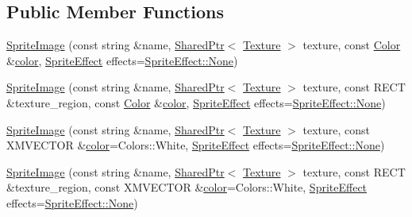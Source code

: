 \subsection*{Public Member Functions}
\begin{DoxyCompactItemize}
\item 
\hyperlink{classmage_1_1_sprite_image_ab94d36963a20b768167c92d5ae1ed116}{Sprite\+Image} (const string \&name, \hyperlink{namespacemage_a1e01ae66713838a7a67d30e44c67703e}{Shared\+Ptr}$<$ \hyperlink{classmage_1_1_texture}{Texture} $>$ texture, const \hyperlink{structmage_1_1_color}{Color} \&\hyperlink{namespacemage_a8ac46837ac2f6a9b756e66979165acd6}{color}, \hyperlink{namespacemage_a9cfe18123066ba4236f548f9de75d881}{Sprite\+Effect} effects=\hyperlink{namespacemage_a9cfe18123066ba4236f548f9de75d881a6adf97f83acf6453d4a6a4b1070f3754}{Sprite\+Effect\+::\+None})
\item 
\hyperlink{classmage_1_1_sprite_image_ad921221e62330d1c872d3e4329a46c35}{Sprite\+Image} (const string \&name, \hyperlink{namespacemage_a1e01ae66713838a7a67d30e44c67703e}{Shared\+Ptr}$<$ \hyperlink{classmage_1_1_texture}{Texture} $>$ texture, const R\+E\+CT \&texture\+\_\+region, const \hyperlink{structmage_1_1_color}{Color} \&\hyperlink{namespacemage_a8ac46837ac2f6a9b756e66979165acd6}{color}, \hyperlink{namespacemage_a9cfe18123066ba4236f548f9de75d881}{Sprite\+Effect} effects=\hyperlink{namespacemage_a9cfe18123066ba4236f548f9de75d881a6adf97f83acf6453d4a6a4b1070f3754}{Sprite\+Effect\+::\+None})
\item 
\hyperlink{classmage_1_1_sprite_image_a00b0f39f640c1a80ff83dc53b62d046c}{Sprite\+Image} (const string \&name, \hyperlink{namespacemage_a1e01ae66713838a7a67d30e44c67703e}{Shared\+Ptr}$<$ \hyperlink{classmage_1_1_texture}{Texture} $>$ texture, const X\+M\+V\+E\+C\+T\+OR \&\hyperlink{namespacemage_a8ac46837ac2f6a9b756e66979165acd6}{color}=Colors\+::\+White, \hyperlink{namespacemage_a9cfe18123066ba4236f548f9de75d881}{Sprite\+Effect} effects=\hyperlink{namespacemage_a9cfe18123066ba4236f548f9de75d881a6adf97f83acf6453d4a6a4b1070f3754}{Sprite\+Effect\+::\+None})
\item 
\hyperlink{classmage_1_1_sprite_image_aeccdb0371366864bdc354fda53c7836f}{Sprite\+Image} (const string \&name, \hyperlink{namespacemage_a1e01ae66713838a7a67d30e44c67703e}{Shared\+Ptr}$<$ \hyperlink{classmage_1_1_texture}{Texture} $>$ texture, const R\+E\+CT \&texture\+\_\+region, const X\+M\+V\+E\+C\+T\+OR \&\hyperlink{namespacemage_a8ac46837ac2f6a9b756e66979165acd6}{color}=Colors\+::\+White, \hyperlink{namespacemage_a9cfe18123066ba4236f548f9de75d881}{Sprite\+Effect} effects=\hyperlink{namespacemage_a9cfe18123066ba4236f548f9de75d881a6adf97f83acf6453d4a6a4b1070f3754}{Sprite\+Effect\+::\+None})

\end{DoxyCompactItemize}
